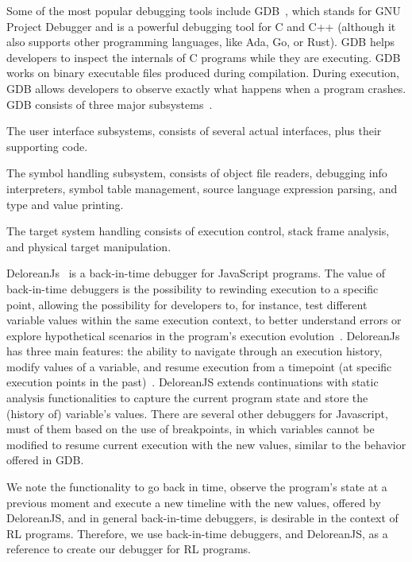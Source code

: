 Some of the most popular debugging tools include \ac{GDB}~\cite{stallman11}, 
which stands for GNU Project Debugger and is a powerful 
debugging tool for C and C++ (although it also supports other programming languages,
like Ada, Go, or Rust). GDB helps developers to inspect the internals of C programs while 
they are executing. \ac{GDB} works on binary executable files produced during compilation. During 
execution, \ac{GDB} allows developers to observe exactly what happens when a program 
crashes. \ac{GDB} consists of three major subsystems~\cite{stallman11}. 
\begin{enumerate*}[label=(\arabic*)] 
\item The user interface subsystems, consists of several actual interfaces, plus their supporting code. 
\item The symbol handling subsystem, consists of object file readers, debugging info interpreters, 
symbol table management, source language expression parsing, and type and value printing. 
\item The target system handling consists of execution control, stack frame analysis, and 
physical target manipulation.
\end{enumerate*}

DeloreanJs~\cite{leger23} is a back-in-time debugger for JavaScript programs. The value of 
back-in-time debuggers is the possibility to rewinding execution to a specific point, allowing the 
possibility for developers to, for instance, test different variable values within the same execution 
context, to better understand errors or explore hypothetical scenarios in the program's execution 
evolution~\cite{hofer06,lienhard09}. DeloreanJs has three main features: the ability to navigate 
through an execution history, modify values of a variable, and resume execution from a timepoint (at 
specific execution points in the past)~\cite{leger23}. DeloreanJS extends continuations with static 
analysis functionalities to capture the current program state and store the (history of) variable's 
values. There are several other debuggers for Javascript, must of them based on the use of 
breakpoints, in which variables cannot be modified to resume current execution with the new values, 
similar to the behavior offered in \ac{GDB}.

We note the functionality to go back in time, observe the program's state at a previous moment and 
execute a new timeline with the new values, offered by DeloreanJS, and in general back-in-time 
debuggers, is desirable in the context of \ac{RL} programs. Therefore, we use  back-in-time 
debuggers, and DeloreanJS, as a reference to create our debugger for \ac{RL} programs.


